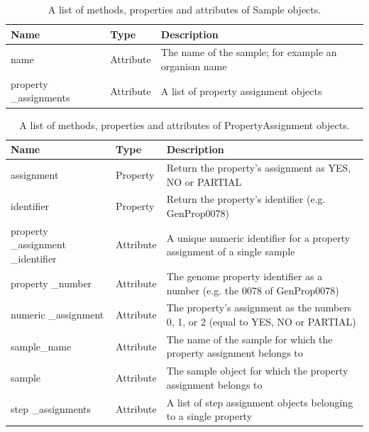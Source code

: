 \begin{table}[!ht]
\centering
\caption{A list of methods, properties and attributes of Sample objects.}
\label{tab:sampleobject}
\begin{tabular}{|p{2.7cm}|p{2cm}|p{10cm}|}
\hline
\textbf{Name} & \textbf{Type} & \textbf{Description} \\ \hline
name & Attribute & The name of the sample; for example an organism name \\ \hline
property \_assignments & Attribute & A list of property assignment objects \\ \hline
\end{tabular}
\end{table}

\begin{table}[!ht]
\centering
\caption{A list of methods, properties and attributes of PropertyAssignment objects.}
\label{tab:propertyassignmentobject}
\begin{tabular}{|p{2.7cm}|p{2cm}|p{10cm}|}
\hline
\textbf{Name} & \textbf{Type} & \textbf{Description} \\ \hline
assignment & Property & Return the property's assignment as YES, NO or PARTIAL \\ \hline
identifier & Property & Return the property's identifier (e.g. GenProp0078) \\ \hline
property \_assignment \_identifier & Attribute & A unique numeric identifier for a property assignment of a single sample \\ \hline
property \_number & Attribute & The genome property identifier as a number (e.g. the 0078 of GenProp0078) \\ \hline
numeric \_assignment & Attribute & The property's assignment as the numbers 0, 1, or 2 (equal to YES, NO or PARTIAL) \\ \hline
sample\_name & Attribute & The name of the sample for which the property assignment belongs to \\ \hline
sample & Attribute & The sample object for which the property assignment belongs to \\ \hline
step \_assignments & Attribute & A list of step assignment objects belonging to a single property \\ \hline
\end{tabular}
\end{table}


